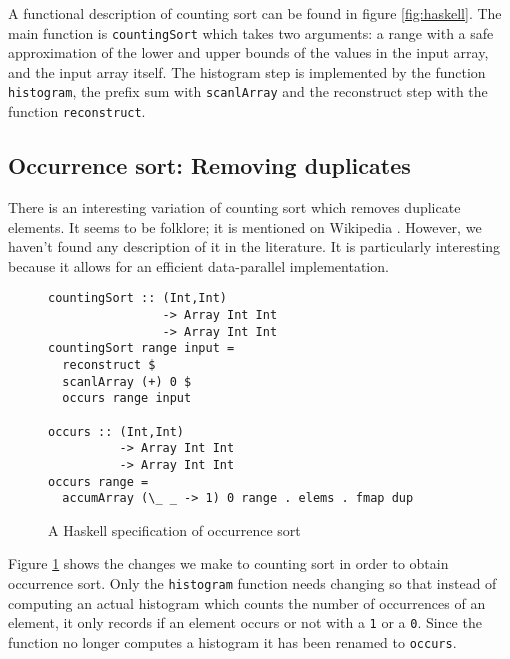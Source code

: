 A functional description of counting sort can be found in figure
\ref{fig:haskell}. The main function is \verb!countingSort! which
takes two arguments: a range with a safe approximation of the lower
and upper bounds of the values in the input array, and the input array
itself. The histogram step is implemented by the function
\verb!histogram!, the prefix sum with \verb!scanlArray! and the
reconstruct step with the function \verb!reconstruct!.

\subsection{Occurrence sort: Removing duplicates}

There is an interesting variation of counting sort which removes
duplicate elements. It seems to be folklore; it is mentioned on
Wikipedia \cite{wikipedia}. However, we haven't found any description
of it in the literature. It is particularly interesting because it
allows for an efficient data-parallel implementation.


\begin{figure}
\begin{small}
\begin{verbatim}
countingSort :: (Int,Int) 
                -> Array Int Int 
                -> Array Int Int
countingSort range input =
  reconstruct $
  scanlArray (+) 0 $
  occurs range input

occurs :: (Int,Int) 
          -> Array Int Int 
          -> Array Int Int
occurs range = 
  accumArray (\_ _ -> 1) 0 range . elems . fmap dup
\end{verbatim}
\end{small}
\caption{A Haskell specification of occurrence sort}
\label{fig:duphaskell}
\end{figure}

Figure \ref{fig:duphaskell} shows the changes we make 
to counting sort in order to obtain occurrence sort.
Only the \verb!histogram! function needs changing
so that instead of computing an actual histogram which counts the
number of occurrences of an element, it only records if an element
occurs or not with a \verb!1! or a \verb!0!. Since the function
no longer computes a histogram it has been renamed to
\verb!occurs!.

